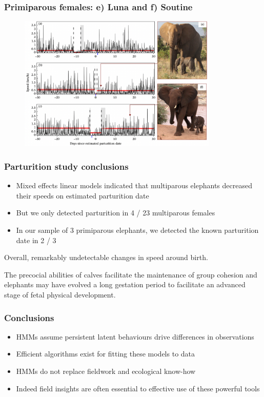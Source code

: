 \documentclass{beamer}
\begin{document}
\begin{frame}
\frametitle{Primiparous females: e) Luna and f) Soutine}

\begin{figure}
    \centering
    \includegraphics[width=0.85\textwidth]{figures/primiparous.png}
\end{figure}
    
\end{frame}

\begin{frame}
\frametitle{Parturition study conclusions}

\begin{itemize}
    \item Mixed effects linear models indicated that multiparous elephants decreased their speeds on estimated parturition date
    \item But we only detected parturition in 4 / 23 multiparous females
    \item In our sample of 3 primiparous elephants, we detected the known parturition date in 2 / 3
\end{itemize}

\vspace{0.5cm}

Overall, remarkably undetectable changes in speed around birth.

\vspace{0.5cm}

The precocial abilities of calves facilitate the maintenance of group cohesion and elephants may have evolved a long
gestation period to facilitate an advanced stage of fetal physical development.
    
\end{frame}

\begin{frame}
\frametitle{Conclusions}

\begin{itemize}
    \item HMMs assume persistent latent behaviours drive differences in observations
    \item Efficient algorithms exist for fitting these models to data
    \item HMMs do not replace fieldwork and ecological know-how
    \item Indeed field insights are often essential to effective use of these powerful tools
\end{itemize}
    
\end{frame}
\end{document}
